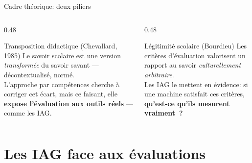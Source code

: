 \begin{frame}{Cadre théorique: deux piliers}
  \begin{columns}[T]
    \begin{column}{0.48\textwidth}
      \begin{block}{Transposition didactique (Chevallard, 1985)}
        Le savoir scolaire est une version \emph{transformée}
        du savoir savant --- décontextualisé, normé.\\[0.4em]
        L'approche par compétences cherche à corriger cet
        écart, mais ce faisant, elle \textbf{expose l'évaluation
        aux outils réels} --- comme les IAG.
      \end{block}
    \end{column}
    \begin{column}{0.48\textwidth}
      \begin{block}{Légitimité scolaire (Bourdieu)}
        Les critères d'évaluation valorisent un rapport
        au savoir \emph{culturellement arbitraire}.\\[0.4em]
        Les IAG le mettent en évidence: si une machine
        satisfait ces critères, \textbf{qu'est-ce qu'ils
        mesurent vraiment~?}
      \end{block}
    \end{column}
  \end{columns}
\end{frame}

\section{Les IAG face aux évaluations}

